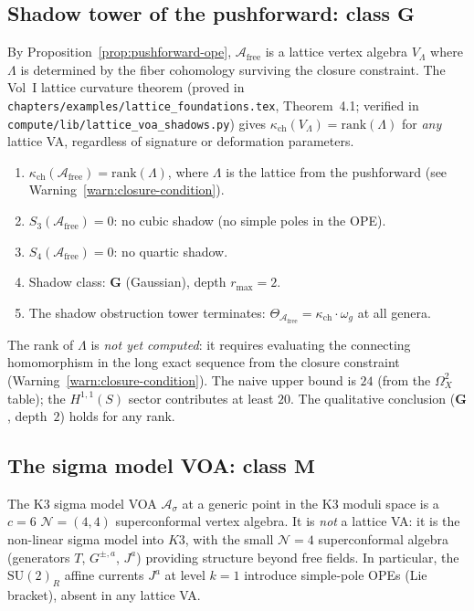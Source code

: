 \documentclass[11pt]{article}
\newcommand{\cA}{\mathcal{A}}
\newcommand{\cN}{\mathcal{N}}
\begin{document}
\subsection{Shadow tower of the pushforward: class $\mathbf{G}$}
\label{subsec:pushforward-shadow}

By Proposition~\ref{prop:pushforward-ope}, $\cA_{\mathrm{free}}$ is a lattice vertex algebra $V_\Lambda$ where $\Lambda$ is determined by the fiber cohomology surviving the closure constraint. The Vol~I lattice curvature theorem (proved in \texttt{chapters/examples/lattice\_foundations.tex}, Theorem~4.1; verified in \texttt{compute/lib/lattice\_voa\_shadows.py}) gives $\kappa_{\mathrm{ch}}(V_\Lambda) = \mathrm{rank}(\Lambda)$ for \emph{any} lattice VA, regardless of signature or deformation parameters.

\begin{claim}
\label{claim:pushforward-shadow}
\hfill
\begin{enumerate}[label=\textup{(\roman*)}]
 \item $\kappa_{\mathrm{ch}}(\cA_{\mathrm{free}}) = \mathrm{rank}(\Lambda)$, where $\Lambda$ is the lattice from the pushforward (see Warning~\ref{warn:closure-condition}).
 \item $S_3(\cA_{\mathrm{free}}) = 0$: no cubic shadow (no simple poles in the OPE).
 \item $S_4(\cA_{\mathrm{free}}) = 0$: no quartic shadow.
 \item Shadow class: $\mathbf{G}$ (Gaussian), depth $r_{\max} = 2$.
 \item The shadow obstruction tower terminates: $\Theta_{\cA_{\mathrm{free}}} = \kappa_{\mathrm{ch}} \cdot \omega_g$ at all genera.
\end{enumerate}
The rank of $\Lambda$ is \emph{not yet computed}: it requires evaluating the connecting homomorphism in the long exact sequence from the closure constraint (Warning~\ref{warn:closure-condition}). The naive upper bound is $24$ (from the $\Omega^2_X$ table); the $H^{1,1}(S)$ sector contributes at least $20$. The qualitative conclusion ($\mathbf{G}$, depth~$2$) holds for any rank.
\end{claim}

\subsection{The sigma model VOA: class $\mathbf{M}$}
\label{subsec:sigma-model-shadow}

The K3 sigma model VOA $\cA_\sigma$ at a generic point in the K3 moduli space is a $c = 6$ $\cN = (4,4)$ superconformal vertex algebra. It is \emph{not} a lattice VA: it is the non-linear sigma model into $K3$, with the small $\cN = 4$ superconformal algebra (generators $T$, $G^{\pm,a}$, $J^a$) providing structure beyond free fields. In particular, the $\mathrm{SU}(2)_R$ affine currents $J^a$ at level $k = 1$ introduce simple-pole OPEs (Lie bracket), absent in any lattice VA.
\end{document}
